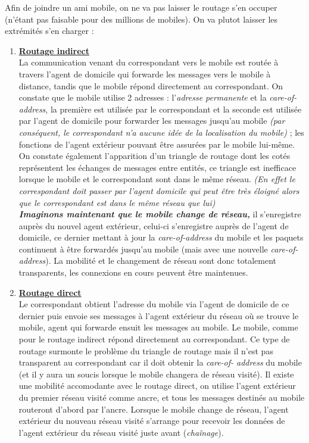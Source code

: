 \documentclass{article}
\begin{document}
\noindent Afin de joindre un ami mobile, on ne va pas laisser le routage s'en occuper (n'étant pas faisable pour 
des millions de mobiles). On va plutot laisser les extrémités s'en charger : 
\begin{enumerate}
\item \textbf{\underline{Routage indirect}}\\
La communication venant du correspondant vers le mobile est routée à travers l'agent de domicile qui forwarde les 
messages vers le mobile à distance, tandis que le mobile répond directement au correspondant. On constate que le 
mobile utilise 2 adresses : l'\textit{adresse permanente} et la \textit{care-of-address}, la première est 
utilisée par le correspondant et la seconde est utilisée par l'agent de domicile pour forwarder les messages 
jusqu'au mobile \textit{(par conséquent, le correspondant n'a aucune idée de la localisation du mobile)} ; les 
fonctions de l'agent extérieur pouvant être assurées par le mobile lui-même. On constate également l'apparition 
d'un triangle de routage dont les cotés représentent les échanges de messages entre entités, ce triangle est 
inefficace lorsque le mobile et le correspondant sont dans le même réseau. \newpage \textit{(En effet le 
correspondant doit passer par l'agent domicile qui peut être très éloigné alors que le correspondant est dans le 
même réseau que lui)} \\
\textbf{\textit{Imaginons maintenant que le mobile change de réseau,}} il s'enregistre auprès du nouvel agent 
extérieur, celui-ci s'enregistre auprès de l'agent de domicile, ce dernier mettant à jour la \textit{care-of-address} du mobile et les paquets continuent à être forwardés jusqu'au mobile (mais avec une nouvelle 
\textit{care-of-address}). La mobilité et le changement de réseau sont donc totalement transparents, les 
connexions en cours peuvent être maintenues.
\item \textbf{\underline{Routage direct}} \\
Le correspondant obtient l'adresse du mobile via l'agent de domicile de ce dernier puis envoie ses messages à 
l'agent extérieur du réseau où se trouve le mobile, agent qui forwarde ensuit les messages au mobile. Le mobile, 
comme pour le routage indirect répond directement au correspondant. Ce type de routage surmonte le problème du 
triangle de routage mais il n'est pas transparent au correspondant car il doit obtenir la \textit{care-of-
address} du mobile (et il y aura un soucis lorsque le mobile changera de réseau visité). 
Il existe une mobilité accomodante avec le routage direct, on utilise l'agent extérieur du premier réseau visité 
comme ancre, et tous les messages destinés au mobile routeront d'abord par l'ancre. Lorsque le mobile change de 
réseau, l'agent extérieur du nouveau réseau visité s'arrange pour recevoir les données de l'agent extérieur du
réseau visité juste avant (\textit{chaînage}).
\end{enumerate}
\end{document}

